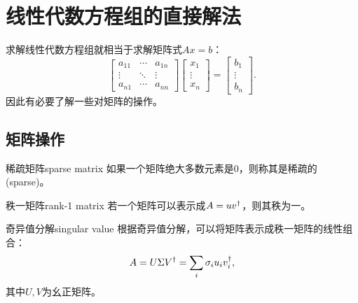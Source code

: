 \chapter{线性代数方程组的直接解法}

求解线性代数方程组就相当于求解矩阵式$Ax=b$：
\begin{equation}
    \begin{bmatrix}
        a_{11}&\cdots&a_{1n}\\
        \vdots&\ddots&\vdots\\
        a_{n1}&\cdots&a_{nn}
    \end{bmatrix}\begin{bmatrix}
        x_1\\\vdots\\x_n
    \end{bmatrix}=\begin{bmatrix}
        b_1\\\vdots\\b_n
    \end{bmatrix}.
\end{equation}
因此有必要了解一些对矩阵的操作。

\section{矩阵操作}

\begin{definition}
    {稀疏矩阵}{sparse matrix}
    如果一个矩阵绝大多数元素是0，则称其是稀疏的(sparse)。
\end{definition}

\begin{definition}
    {秩一矩阵}{rank-1 matrix}
    若一个矩阵可以表示成$A=uv^\dagger$，则其秩为一。
\end{definition}

\begin{theorem}
    {奇异值分解}{singular value}
    根据奇异值分解，可以将矩阵表示成秩一矩阵的线性组合：
    \begin{equation}
        A=U\Sigma V^\dagger=\sum_i\sigma_iu_iv_i^\dagger,
    \end{equation}
    其中$U,V$为幺正矩阵。
\end{theorem}

